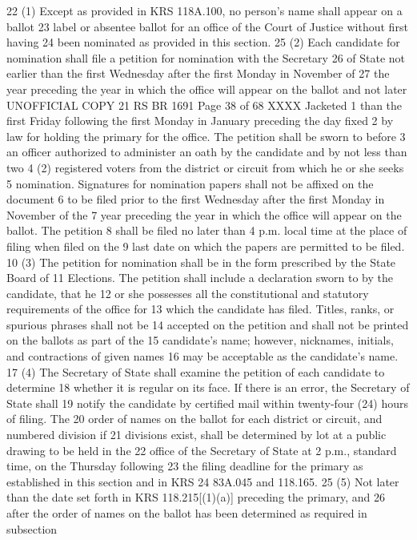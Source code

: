 22 (1) Except as provided in KRS 118A.100, no person's name shall appear on a ballot
23 label or absentee ballot for an office of the Court of Justice without first having
24 been nominated as provided in this section.
25 (2) Each candidate for nomination shall file a petition for nomination with the Secretary
26 of State not earlier than the first Wednesday after the first Monday in November of
27 the year preceding the year in which the office will appear on the ballot and not later 
UNOFFICIAL COPY 21 RS BR 1691
Page 38 of 68
XXXX Jacketed
1 than the first Friday following the first Monday in January preceding the day fixed
2 by law for holding the primary for the office. The petition shall be sworn to before
3 an officer authorized to administer an oath by the candidate and by not less than two
4 (2) registered voters from the district or circuit from which he or she seeks
5 nomination. Signatures for nomination papers shall not be affixed on the document
6 to be filed prior to the first Wednesday after the first Monday in November of the
7 year preceding the year in which the office will appear on the ballot. The petition
8 shall be filed no later than 4 p.m. local time at the place of filing when filed on the
9 last date on which the papers are permitted to be filed.
10 (3) The petition for nomination shall be in the form prescribed by the State Board of
11 Elections. The petition shall include a declaration sworn to by the candidate, that he
12 or she possesses all the constitutional and statutory requirements of the office for
13 which the candidate has filed. Titles, ranks, or spurious phrases shall not be
14 accepted on the petition and shall not be printed on the ballots as part of the
15 candidate's name; however, nicknames, initials, and contractions of given names
16 may be acceptable as the candidate's name.
17 (4) The Secretary of State shall examine the petition of each candidate to determine
18 whether it is regular on its face. If there is an error, the Secretary of State shall
19 notify the candidate by certified mail within twenty-four (24) hours of filing. The
20 order of names on the ballot for each district or circuit, and numbered division if
21 divisions exist, shall be determined by lot at a public drawing to be held in the
22 office of the Secretary of State at 2 p.m., standard time, on the Thursday following
23 the filing deadline for the primary as established in this section and in KRS
24 83A.045 and 118.165.
25 (5) Not later than the date set forth in KRS 118.215[(1)(a)] preceding the primary, and
26 after the order of names on the ballot has been determined as required in subsection
